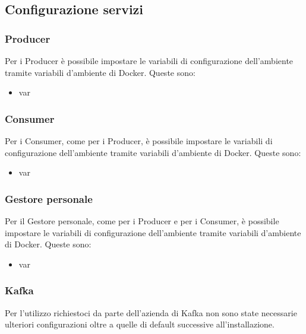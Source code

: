 \subsection{Configurazione servizi \progetto}
	
	\subsubsection{Producer}
	Per i Producer è possibile impostare le variabili di configurazione dell'ambiente tramite variabili d'ambiente di Docker. Queste sono: 
	\begin{itemize}
		\item var
	\end{itemize}
	
	\subsubsection{Consumer}
	Per i Consumer, come per i Producer, è possibile impostare le variabili di configurazione dell'ambiente tramite variabili d'ambiente di Docker. Queste sono: 
	\begin{itemize}
		\item var
	\end{itemize}

	\subsubsection{Gestore personale}
	Per il Gestore personale, come per i Producer e per i Consumer, è possibile impostare le variabili di configurazione dell'ambiente tramite variabili d'ambiente di Docker. Queste sono: 
	\begin{itemize}
		\item var
	\end{itemize}
	
	\subsubsection{Kafka}
	Per l'utilizzo richiestoci da parte dell'azienda di Kafka non sono state necessarie ulteriori configurazioni oltre a quelle di default successive all'installazione.
	